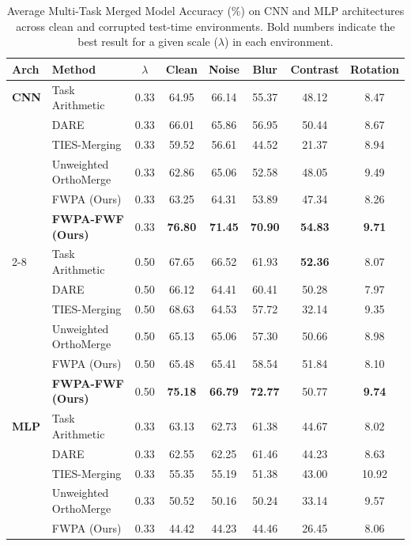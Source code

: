 \documentclass{article}
\theoremstyle{plain}
\theoremstyle{definition}
\theoremstyle{remark}
\begin{document}
\begin{table}[t]
\caption{Average Multi-Task Merged Model Accuracy (\%) on CNN and MLP architectures across clean and corrupted test-time environments. Bold numbers indicate the best result for a given scale ($\lambda$) in each environment.}
\label{tab:combined_results}
\vskip 0.02in
\begin{center}
\begin{scriptsize}
\begin{sc}
\setlength{\tabcolsep}{4.0pt}
\begin{tabular}{llcccccc}
\toprule
Arch & Method & $\lambda$ & Clean & Noise & Blur & Contrast & Rotation \\
\midrule
\textbf{CNN} & Task Arithmetic & 0.33 & 64.95 & 66.14 & 55.37 & 48.12 & 8.47 \\
& DARE & 0.33 & 66.01 & 65.86 & 56.95 & 50.44 & 8.67 \\
& TIES-Merging & 0.33 & 59.52 & 56.61 & 44.52 & 21.37 & 8.94 \\
& Unweighted OrthoMerge & 0.33 & 62.86 & 65.06 & 52.58 & 48.05 & 9.49 \\
& FWPA (Ours) & 0.33 & 63.25 & 64.31 & 53.89 & 47.34 & 8.26 \\
& \textbf{FWPA-FWF (Ours)} & 0.33 & \textbf{76.80} & \textbf{71.45} & \textbf{70.90} & \textbf{54.83} & \textbf{9.71} \\
\cmidrule(r){2-8}
& Task Arithmetic & 0.50 & 67.65 & 66.52 & 61.93 & \textbf{52.36} & 8.07 \\
& DARE & 0.50 & 66.12 & 64.41 & 60.41 & 50.28 & 7.97 \\
& TIES-Merging & 0.50 & 68.63 & 64.53 & 57.72 & 32.14 & 9.35 \\
& Unweighted OrthoMerge & 0.50 & 65.13 & 65.06 & 57.30 & 50.66 & 8.98 \\
& FWPA (Ours) & 0.50 & 65.48 & 65.41 & 58.54 & 51.84 & 8.10 \\
& \textbf{FWPA-FWF (Ours)} & 0.50 & \textbf{75.18} & \textbf{66.79} & \textbf{72.77} & 50.77 & \textbf{9.74} \\
\midrule
\textbf{MLP} & Task Arithmetic & 0.33 & 63.13 & 62.73 & 61.38 & 44.67 & 8.02 \\
& DARE & 0.33 & 62.55 & 62.25 & 61.46 & 44.23 & 8.63 \\
& TIES-Merging & 0.33 & 55.35 & 55.19 & 51.38 & 43.00 & 10.92 \\
& Unweighted OrthoMerge & 0.33 & 50.52 & 50.16 & 50.24 & 33.14 & 9.57 \\
& FWPA (Ours) & 0.33 & 44.42 & 44.23 & 44.46 & 26.45 & 8.06 \\

\end{tabular}
\end{sc}
\end{scriptsize}
\end{center}
\end{table}
\end{document}
